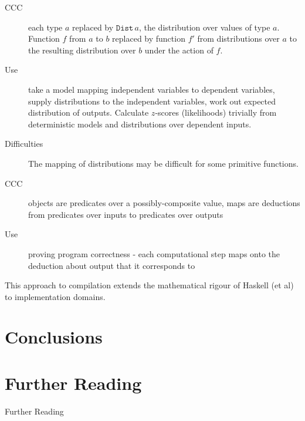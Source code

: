 \documentclass[10pt]{beamer}
\newcommand{\Dist}[1]{\ensuremath{\mathtt{Dist}\,#1}}
\theoremstyle{definition}
\theoremstyle{remark}
\numberwithin{equation}{section}
\begin{document}
\begin{frame}[fragile]{}
  \begin{description}
  \item[CCC] each type $a$ replaced by $\Dist{a}$, the distribution over values of type $a$. Function $f$ from $a$ to $b$ replaced by function $f'$ from distributions over $a$ to the resulting distribution over $b$ under the action of $f$.
  \item[Use] take a model mapping independent variables to dependent variables, supply distributions to the independent variables, work out expected distribution of outputs. Calculate $z$-scores (likelihoods) trivially from deterministic models and distributions over dependent inputs.
  \item[Difficulties] The mapping of distributions may be difficult for some primitive functions.
  \end{description}
\end{frame}

\begin{frame}[fragile]{}
  \begin{description}
  \item[CCC] objects are predicates over a possibly-composite value, maps are deductions from predicates over inputs to predicates over outputs
  \item[Use] proving program correctness - each computational step maps onto the deduction about output that it corresponds to
  \end{description}
\end{frame}

\begin{frame}[fragile]{}
  This approach to compilation extends the mathematical rigour of Haskell (et al) to implementation domains.
\end{frame}

\section{Conclusions} %

\section{Further Reading}

\begin{frame}[fragile]{Further Reading}

  \nocite{elkins_calculating_2009}
  \nocite{diel:blog}
  \nocite{milewski2014}

  
  

\end{frame}
\end{document}
